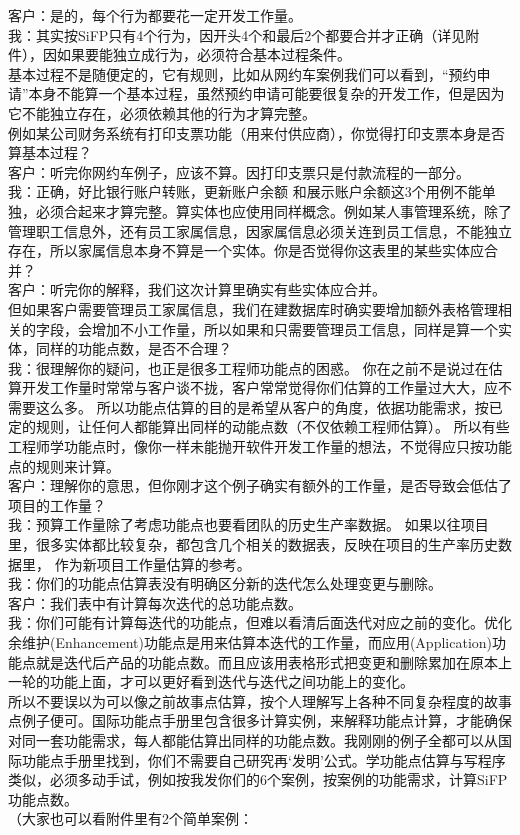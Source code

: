 客户：是的，每个行为都要花一定开发工作量。\\
我：其实按SiFP只有4个行为，因开头4个和最后2个都要合并才正确（详见附件），因如果要能独立成行为，必须符合基本过程条件。\\
基本过程不是随便定的，它有规则，比如从网约车案例我们可以看到，``预约申请''本身不能算一个基本过程，虽然预约申请可能要很复杂的开发工作，但是因为它不能独立存在，必须依赖其他的行为才算完整。\\
例如某公司财务系统有打印支票功能（用来付供应商），你觉得打印支票本身是否算基本过程？\\
客户：听完你网约车例子，应该不算。因打印支票只是付款流程的一部分。\\
我：正确，好比银行账户转账，更新账户余额
和展示账户余额这3个用例不能单独，必须合起来才算完整。算实体也应使用同样概念。例如某人事管理系统，除了管理职工信息外，还有员工家属信息，因家属信息必须关连到员工信息，不能独立存在，所以家属信息本身不算是一个实体。你是否觉得你这表里的某些实体应合并？\\
客户：听完你的解释，我们这次计算里确实有些实体应合并。\\
但如果客户需要管理员工家属信息，我们在建数据库时确实要增加额外表格管理相关的字段，会增加不小工作量，所以如果和只需要管理员工信息，同样是算一个实体，同样的功能点数，是否不合理？\\
我：很理解你的疑问，也正是很多工程师功能点的困惑。
你在之前不是说过在估算开发工作量时常常与客户谈不拢，客户常常觉得你们估算的工作量过大大，应不需要这么多。
所以功能点估算的目的是希望从客户的角度，依据功能需求，按已定的规则，让任何人都能算出同样的动能点数（不仅依赖工程师估算）。
所以有些工程师学功能点时，像你一样未能抛开软件开发工作量的想法，不觉得应只按功能点的规则来计算。\\
客户：理解你的意思，但你刚才这个例子确实有额外的工作量，是否导致会低估了项目的工作量？\\
我：预算工作量除了考虑功能点也要看团队的历史生产率数据。
如果以往项目里，很多实体都比较复杂，都包含几个相关的数据表，反映在项目的生产率历史数据里，
作为新项目工作量估算的参考。\\
我：你们的功能点估算表没有明确区分新的迭代怎么处理变更与删除。\\
客户：我们表中有计算每次迭代的总功能点数。\\
我：你们可能有计算每迭代的功能点，但难以看清后面迭代对应之前的变化。优化余维护(Enhancement)功能点是用来估算本迭代的工作量，而应用(Application)功能点就是迭代后产品的功能点数。而且应该用表格形式把变更和删除累加在原本上一轮的功能上面，才可以更好看到迭代与迭代之间功能上的变化。\\
所以不要误以为可以像之前故事点估算，按个人理解写上各种不同复杂程度的故事点例子便可。国际功能点手册里包含很多计算实例，来解释功能点计算，才能确保对同一套功能需求，每人都能估算出同样的功能点数。我刚刚的例子全都可以从国际功能点手册里找到，你们不需要自己研究再`发明'公式。学功能点估算与写程序类似，必须多动手试，例如按我发你们的6个案例，按案例的功能需求，计算SiFP功能点数。\\
（大家也可以看附件里有2个简单案例：

